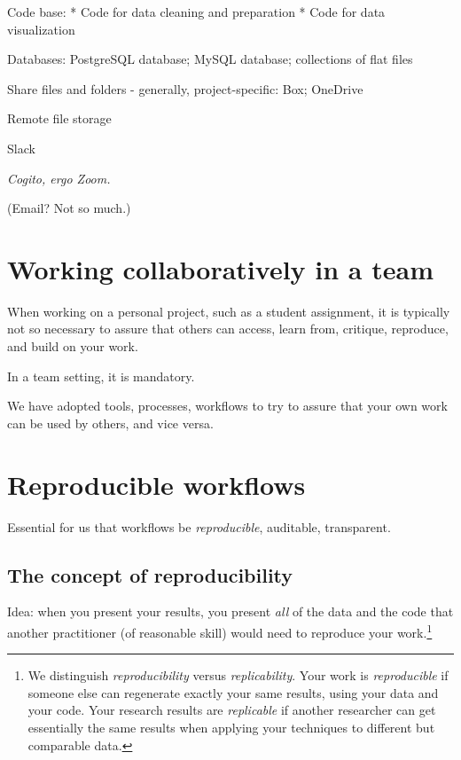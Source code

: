 \documentclass[
]{book}
\begin{document}
Code base:
* Code for data cleaning and preparation
* Code for data visualization

Databases: PostgreSQL database; MySQL database; collections of flat files

Share files and folders - generally, project-specific: Box; OneDrive

Remote file storage

Slack

\emph{Cogito, ergo Zoom.}

(Email? Not so much.)

\hypertarget{working-collaboratively-in-a-team}{%
\section{Working collaboratively in a team}\label{working-collaboratively-in-a-team}}

When working on a personal project, such as a student assignment, it is typically not so necessary to assure that others can access, learn from, critique, reproduce, and build on your work.

In a team setting, it is mandatory.

We have adopted tools, processes, workflows to try to assure that your own work can be used by others, and vice versa.

\hypertarget{reproducible-workflows}{%
\section{Reproducible workflows}\label{reproducible-workflows}}

Essential for us that workflows be \emph{reproducible}, auditable, transparent.

\hypertarget{the-concept-of-reproducibility}{%
\subsection{The concept of reproducibility}\label{the-concept-of-reproducibility}}

Idea: when you present your results, you present \emph{all} of the data and the code that another practitioner (of reasonable skill) would need to reproduce your work.\footnote{We distinguish \emph{reproducibility} versus \emph{replicability}. Your work is \emph{reproducible} if someone else can regenerate exactly your same results, using your data and your code. Your research results are \emph{replicable} if another researcher can get essentially the same results when applying your techniques to different but comparable data.}
\end{document}
